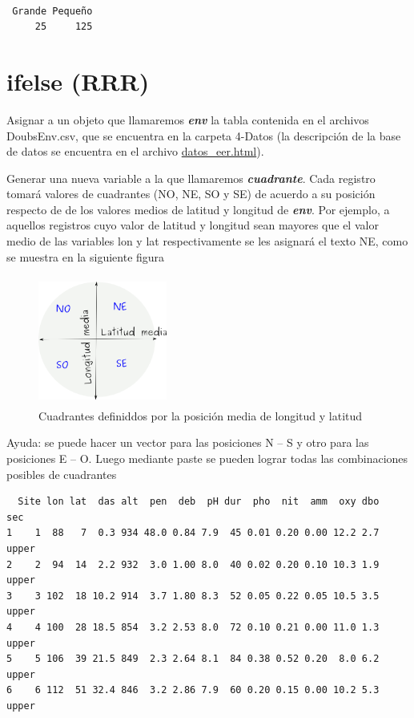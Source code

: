 \documentclass[]{book}
\begin{document}
\begin{verbatim}

 Grande Pequeño 
     25     125 
\end{verbatim}

\hypertarget{ifelse-rrr}{%
\section{ifelse (RRR)}\label{ifelse-rrr}}

Asignar a un objeto que llamaremos \textbf{\emph{env}} la tabla contenida en el archivos DoubsEnv.csv, que se encuentra en la carpeta 4-Datos (la descripción de la base de datos se encuentra en el archivo \url{datos_eer.html}).

Generar una nueva variable a la que llamaremos \emph{\textbf{cuadrante}}. Cada registro tomará valores de cuadrantes (NO, NE, SO y SE) de acuerdo a su posición respecto de de los valores medios de latitud y longitud de \textbf{\emph{env}}. Por ejemplo, a aquellos registros cuyo valor de latitud y longitud sean mayores que el valor medio de las variables lon y lat respectivamente se les asignará el texto NE, como se muestra en la siguiente figura

\begin{figure}
\centering
\includegraphics[width=1.66667in,height=1.66667in]{figuras/cuadrantes.png}
\caption{Cuadrantes definiddos por la posición media de longitud y latitud}
\end{figure}

Ayuda: se puede hacer un vector para las posiciones N -- S y otro para las posiciones E -- O. Luego mediante paste se pueden lograr todas las combinaciones posibles de cuadrantes

\begin{verbatim}
  Site lon lat  das alt  pen  deb  pH dur  pho  nit  amm  oxy dbo   sec
1    1  88   7  0.3 934 48.0 0.84 7.9  45 0.01 0.20 0.00 12.2 2.7 upper
2    2  94  14  2.2 932  3.0 1.00 8.0  40 0.02 0.20 0.10 10.3 1.9 upper
3    3 102  18 10.2 914  3.7 1.80 8.3  52 0.05 0.22 0.05 10.5 3.5 upper
4    4 100  28 18.5 854  3.2 2.53 8.0  72 0.10 0.21 0.00 11.0 1.3 upper
5    5 106  39 21.5 849  2.3 2.64 8.1  84 0.38 0.52 0.20  8.0 6.2 upper
6    6 112  51 32.4 846  3.2 2.86 7.9  60 0.20 0.15 0.00 10.2 5.3 upper
\end{verbatim}
\end{document}
